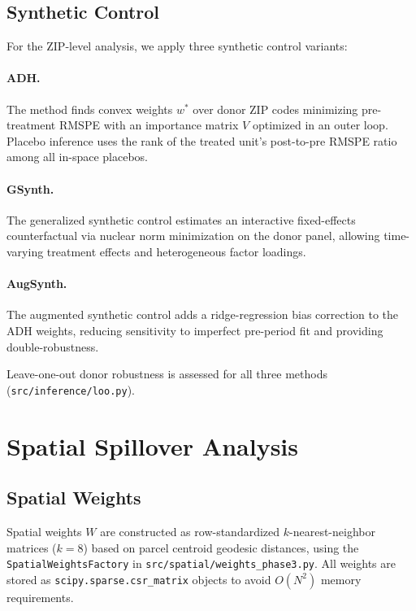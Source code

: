 \documentclass[12pt]{article}
\begin{document}
\subsection{Synthetic Control}

For the ZIP-level analysis, we apply three synthetic control variants:

\paragraph{ADH.} The \citet{Abadie2010} method finds convex weights $w^*$
over donor ZIP codes minimizing pre-treatment RMSPE with an importance matrix
$V$ optimized in an outer loop. Placebo inference uses the rank of the treated
unit's post-to-pre RMSPE ratio among all in-space placebos.

\paragraph{GSynth.} The generalized synthetic control \citep{Xu2017} estimates
an interactive fixed-effects counterfactual via nuclear norm minimization on the
donor panel, allowing time-varying treatment effects and heterogeneous factor
loadings.

\paragraph{AugSynth.} The augmented synthetic control \citep{BenMichael2021}
adds a ridge-regression bias correction to the ADH weights, reducing sensitivity
to imperfect pre-period fit and providing double-robustness.

Leave-one-out donor robustness is assessed for all three methods
(\texttt{src/inference/loo.py}).

\section{Spatial Spillover Analysis}
\label{sec:spatial}

\subsection{Spatial Weights}

Spatial weights $W$ are constructed as row-standardized $k$-nearest-neighbor
matrices ($k=8$) based on parcel centroid geodesic distances, using the
\texttt{SpatialWeightsFactory} in \texttt{src/spatial/weights\_phase3.py}.
All weights are stored as \texttt{scipy.sparse.csr\_matrix} objects to avoid
$O(N^2)$ memory requirements.
\end{document}
